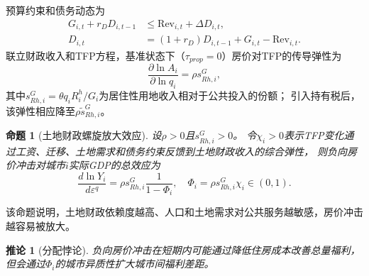 \documentclass[UTF8,a4paper,12pt]{ctexart}
\theoremstyle{plain}
\newtheorem{proposition}{命题}
\newtheorem{corollary}{推论}
\theoremstyle{definition}
\theoremstyle{remark}
\newcommand{\Rh}{R^{h}}
\begin{document}
预算约束和债务动态为
\begin{align}
  G_{i,t}+r_DD_{i,t-1}&\leq \text{Rev}_{i,t}+\Delta D_{i,t},
  \label{eq:gov_budget}\\
  D_{i,t}&=(1+r_D)D_{i,t-1}+G_{i,t}-\text{Rev}_{i,t}.
  \label{eq:debt}
\end{align}
联立财政收入和TFP方程，基准状态下（$\tau_{prop}=0$）房价对TFP的传导弹性为
\begin{equation}
  \frac{\partial\ln A_i}{\partial\ln q_i}=\rho s_{Rh,i}^G,
  \label{eq:tfp_q_elas}
\end{equation}
其中$s_{Rh,i}^G=\theta q_i\Rh_i/G_i$为居住性用地收入相对于公共投入的份额；
引入持有税后，该弹性相应降至$\rho\tilde{s}_{Rh,i}^G$。

\begin{proposition}[土地财政螺旋放大效应]
  \label{prop:spiral}
  设$\rho>0$且$s_{Rh,i}^G>0$。
  令$\chi_i>0$表示TFP变化通过工资、迁移、土地需求和债务约束反馈到土地财政收入的综合弹性，
  则负向房价冲击对城市$i$实际GDP的总效应为
  \begin{equation}
    \frac{d\ln Y_i}{d\varepsilon^q}=\rho s_{Rh,i}^G\frac{1}{1-\Phi_i},
    \quad \Phi_i=\rho s_{Rh,i}^G\chi_i\in(0,1).
    \label{eq:spiral}
  \end{equation}
\end{proposition}
该命题说明，土地财政依赖度越高、人口和土地需求对公共服务越敏感，房价冲击越容易被放大。
\begin{corollary}[分配悖论]
  \label{cor:paradox}
  负向房价冲击在短期内可能通过降低住房成本改善总量福利，
  但会通过$\Phi_i$的城市异质性扩大城市间福利差距。
\end{corollary}
\end{document}
